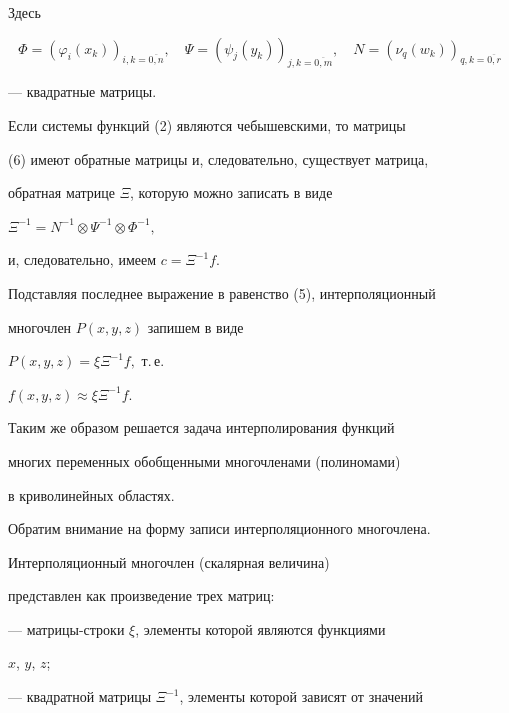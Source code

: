 Здесь


\begin{equation}


\Phi=(\varphi_i(x_k))_{i,k=\overline{0,n}},\quad


\Psi=(\psi_j(y_k))_{j,k=\overline{0,m}},\quad


N=(\nu_q(w_k))_{q,k=\overline{0,r}}


\end{equation}


--- квадратные матрицы.





Если системы функций (2) являются чебышевскими, то матрицы


(6) имеют обратные матрицы и, следовательно, существует матрица,


обратная матрице $\Xi$, которую можно записать в виде


$\Xi^{-1}=N^{-1}\otimes\Psi^{-1}\otimes\Phi^{-1},$


и, следовательно, имеем $c=\Xi^{-1}f.$





Подставляя последнее выражение в равенство (5), интерполяционный


многочлен $P(x,y,z)$ запишем в виде


$P(x,y,z)=\xi\Xi^{-1}f,$ т.\,е.


$f(x,y,z)\approx\xi\Xi^{-1}f.$





Таким же образом решается задача интерполирования функций


многих переменных обобщенными многочленами (полиномами)


в криволинейных областях.





Обратим внимание на форму записи интерполяционного многочлена.


Интерполяционный многочлен (скалярная величина)


представлен как произведение трех матриц:





--- матрицы-строки $\xi$, элементы которой являются функциями


$x$, $y$, $z$;





--- квадратной матрицы $\Xi^{-1}$, элементы которой зависят от значений


